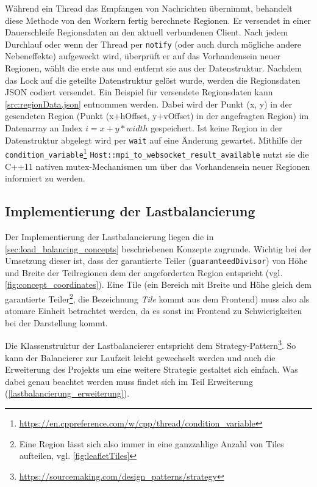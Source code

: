 Während ein Thread das Empfangen von Nachrichten übernimmt, behandelt diese Methode von den Workern fertig berechnete Regionen.
Er versendet in einer Dauerschleife Regionsdaten an den aktuell verbundenen Client.
Nach jedem Durchlauf oder wenn der Thread per \verb|notify| (oder auch durch mögliche andere Nebeneffekte) aufgeweckt wird,
überprüft er auf das Vorhandensein neuer Regionen, wählt die erste aus und entfernt sie aus der Datenstruktur.
Nachdem das Lock auf die geteilte Datenstruktur gelöst wurde, werden die Regionsdaten JSON codiert versendet.
Ein Beispiel für versendete Regionsdaten kann \autoref{src:regionData.json} entnommen werden.
Dabei wird der Punkt (x, y) in der gesendeten Region (Punkt (x+hOffset, y+vOffset) in der angefragten Region)
im Datenarray an Index $i = x + y * width$ gespeichert.
Ist keine Region in der Datenstruktur abgelegt wird per \verb|wait| auf eine Änderung gewartet.
Mithilfe der \verb|condition_variable|\footnote{\url{https://en.cppreference.com/w/cpp/thread/condition_variable}} \verb|Host::mpi_to_websocket_result_available|
nutzt sie die C++11 nativen mutex-Mechanismen um über das Vorhandensein neuer Regionen informiert zu werden.

\begin{figure}[!h]
	
\end{figure}

\subsection{Implementierung der Lastbalancierung}\label{sec:load_balancing}
Der Implementierung der Lastbalancierung liegen die in \autoref{sec:load_balancing_concepts} beschriebenen Konzepte zugrunde.
Wichtig bei der Umsetzung dieser ist, dass der garantierte Teiler (\verb|guaranteedDivisor|) von Höhe und Breite der Teilregionen dem der angeforderten Region entspricht (vgl. \autoref{fig:concept_coordinates}).
Eine Tile (ein Bereich mit Breite und Höhe gleich dem garantierte Teiler\footnote{Eine Region lässt sich also immer in eine ganzzahlige Anzahl von Tiles aufteilen, vgl. \autoref{fig:leafletTiles}}, die Bezeichnung \textit{Tile} kommt aus dem Frontend) muss also als atomare Einheit betrachtet werden, da es sonst im Frontend zu Schwierigkeiten bei der Darstellung kommt.

Die Klassenstruktur der Lastbalancierer entspricht dem Strategy-Pattern\footnote{\url{https://sourcemaking.com/design_patterns/strategy}}. So kann der Balancierer zur Laufzeit leicht gewechselt werden und auch die Erweiterung des Projekts um eine weitere Strategie gestaltet sich einfach.
Was dabei genau beachtet werden muss findet sich im Teil Erweiterung (\ref{lastbalancierung_erweiterung}).

